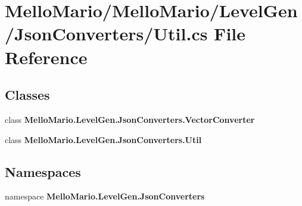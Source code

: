 \section{Mello\+Mario/\+Mello\+Mario/\+Level\+Gen/\+Json\+Converters/\+Util.cs File Reference}
\label{Util_8cs}
\subsection*{Classes}
\begin{DoxyCompactItemize}
\item 
class \textbf{ Mello\+Mario.\+Level\+Gen.\+Json\+Converters.\+Vector\+Converter}
\item 
class \textbf{ Mello\+Mario.\+Level\+Gen.\+Json\+Converters.\+Util}
\end{DoxyCompactItemize}
\subsection*{Namespaces}
\begin{DoxyCompactItemize}
\item 
namespace \textbf{ Mello\+Mario.\+Level\+Gen.\+Json\+Converters}
\end{DoxyCompactItemize}
